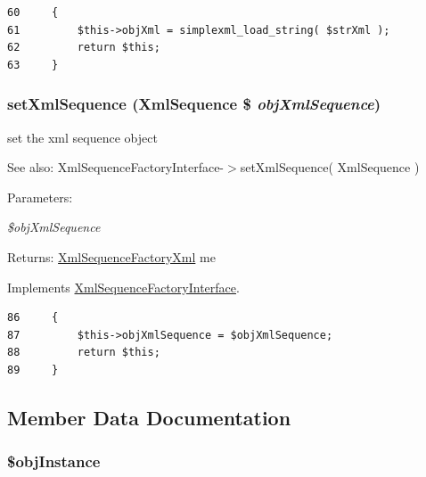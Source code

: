 \begin{Code}\begin{verbatim}60     {
61         $this->objXml = simplexml_load_string( $strXml );
62         return $this;
63     }
\end{verbatim}
\end{Code}


\hypertarget{class_xml_sequence_factory_xml_65967fe6cc76b0c0b28aa39e9acffcab}{
\subsubsection[{setXmlSequence}]{\setlength{\rightskip}{0pt plus 5cm}setXmlSequence ({\bf XmlSequence} \$ {\em objXmlSequence})}}
\label{class_xml_sequence_factory_xml_65967fe6cc76b0c0b28aa39e9acffcab}


set the xml sequence object

\begin{Desc}
\item[See also:]XmlSequenceFactoryInterface-$>$setXmlSequence( XmlSequence ) \end{Desc}
\begin{Desc}
\item[Parameters:]
\begin{description}
\item[{\em \$objXmlSequence}]\end{description}
\end{Desc}
\begin{Desc}
\item[Returns:]\hyperlink{class_xml_sequence_factory_xml}{XmlSequenceFactoryXml} me \end{Desc}


Implements \hyperlink{interface_xml_sequence_factory_interface_65967fe6cc76b0c0b28aa39e9acffcab}{XmlSequenceFactoryInterface}.

\begin{Code}\begin{verbatim}86     {
87         $this->objXmlSequence = $objXmlSequence;        
88         return $this;
89     }
\end{verbatim}
\end{Code}




\subsection{Member Data Documentation}
\hypertarget{class_xml_sequence_factory_xml_917d057900327b25608ed26c927eac3b}{
\subsubsection[{\$objInstance}]{\setlength{\rightskip}{0pt plus 5cm}\$objInstance}}
\label{class_xml_sequence_factory_xml_917d057900327b25608ed26c927eac3b}


